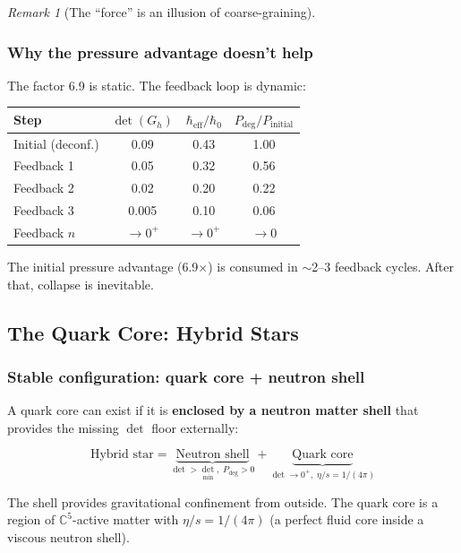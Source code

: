 \documentclass[12pt]{article}
\theoremstyle{remark}
\newtheorem{remark}[theorem]{Remark}
\theoremstyle{definition}
\newcommand{\CC}{\mathbb{C}}
\begin{document}
\begin{remark}[The ``force'' is an illusion of coarse-graining]
\subsubsection{Why the pressure advantage doesn't help}

The factor 6.9 is static. The feedback loop is dynamic:

\begin{center}
\begin{tabular}{lccc}
\hline
Step & $\det(G_h)$ & $\hbar_\text{eff}/\hbar_0$ & $P_\text{deg}/P_\text{initial}$ \\
\hline
Initial (deconf.) & 0.09 & 0.43 & 1.00 \\
Feedback 1 & 0.05 & 0.32 & 0.56 \\
Feedback 2 & 0.02 & 0.20 & 0.22 \\
Feedback 3 & 0.005 & 0.10 & 0.06 \\
Feedback $n$ & $\to 0^+$ & $\to 0^+$ & $\to 0$ \\
\hline
\end{tabular}
\end{center}

The initial pressure advantage (6.9$\times$) is consumed in $\sim$2--3 feedback cycles. After that, collapse is inevitable.

\subsection{The Quark Core: Hybrid Stars}

\subsubsection{Stable configuration: quark core + neutron shell}

A quark core can exist if it is \textbf{enclosed by a neutron matter shell} that provides the missing $\det$ floor externally:

\begin{equation}
\text{Hybrid star} = \underbrace{\text{Neutron shell}}_{\det > \det_\text{min},\; P_\text{deg} > 0} + \underbrace{\text{Quark core}}_{\det \to 0^+,\; \eta/s = 1/(4\pi)}
\end{equation}

The shell provides gravitational confinement from outside. The quark core is a region of $\CC^5$-active matter with $\eta/s = 1/(4\pi)$ (a perfect fluid core inside a viscous neutron shell).


\end{remark}
\end{document}
